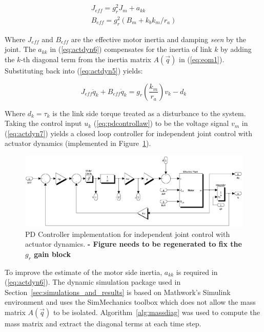 \begin{equation}
	\begin{array}{l}
		{J_{eff}} = g_r^2{J_m} + {a_{kk}}\\
		{B_{eff}} = g_r^2({B_m} + {k_b}{k_m}/{r_a})
	\end{array}
	\label{eq:actdyn6}
\end{equation}

Where ${J_{eff}}$ and ${B_{eff}}$ are the effective motor inertia and damping \emph{seen} by the joint. The ${a_{kk}}$ in (\ref{eq:actdyn6}) compensates for the inertia of link $k$ by adding the $k$-th diagonal term from the inertia matrix $A(\vec{q})$ in (\ref{eq:eom1}). Substituting back into (\ref{eq:actdyn5}) yields: 

\begin{equation}
	{J_{eff}}{\ddot q_k} + {B_{eff}}{\dot q_k} = g_r^{}\left( {\frac{{{k_m}}}{{{r_a}}}} \right){v_k} - {d_k}
	\label{eq:actdyn7}
\end{equation}

Where ${d_k} = \tau _k$ is the link side torque treated as a disturbance to the system. Taking the control input $u _k$ (\ref{eq:pdcontrollaw}) to be the voltage signal $v _m$ in (\ref{eq:actdyn7}) yields a closed loop controller for independent joint control with actuator dynamics (implemented in Figure~\ref{fig:pdmotorcontroller}).

\begin{figure}[!h]
	\centering
    \includegraphics[scale=0.5]{fig/experiments/pdmotorcontroller.eps} 
  	\caption{PD Controller implementation for independent joint control with actuator dynamics. \Incomplete \textbf{- Figure needs to be regenerated to fix the $g_r$ gain block}}
	\label{fig:pdmotorcontroller}
\end{figure}

To improve the estimate of the motor side inertia, $a_{kk}$ is required in (\ref{eq:actdyn6}). The dynamic simulation package used in Section~\ref{sec:simulations_and_results} is based on Mathwork's Simulink environment and uses the SimMechanics toolbox which does not allow the mass matrix $A(\vec{q})$ to be isolated. Algorithm~\ref{alg:massdiag} was used to compute the mass matrix and extract the diagonal terms at each time step. 

